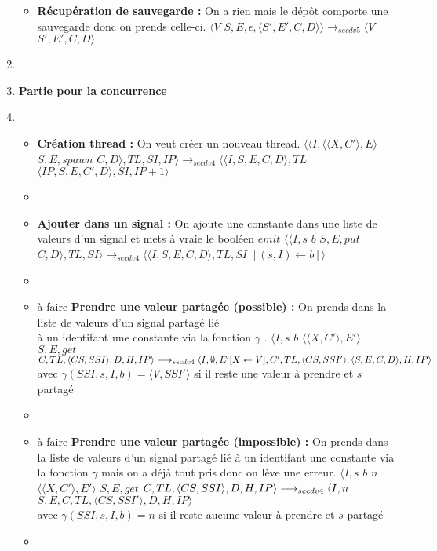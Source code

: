 \documentclass[10pt,a4paper]{article}
\begin{document}
\begin{enumerate}
\begin{itemize}
				\item[] \textbf{Récupération de sauvegarde :}  On a rien mais le dépôt comporte une sauvegarde donc on prends celle-ci.
				\smallbreak  
				$\langle V$ $S,E,\epsilon,\langle S',E',C,D\rangle\rangle
				\longrightarrow_{secdv5} \langle V$ $S',E',C,D\rangle$
			\end{itemize}
			\item[]
			
			
			
			\item[] \textbf{Partie pour la concurrence} 
			\item[]
			\begin{itemize}
				\item[]  \textbf{Création thread :} On veut créer un nouveau thread.
				\smallbreak $\langle\langle I,\langle\langle X,C'\rangle, E\rangle$ $S,E,spawn$ $C,D\rangle,TL,SI,IP\rangle 
				\longrightarrow_{secdv4} \langle\langle I,S,E,C,D\rangle,TL$ $\langle IP,S,E,C',D\rangle,SI,IP+1\rangle$
				\item[]
				
				\item[] \textbf{Ajouter dans un signal :} On ajoute une constante dans une liste de valeurs d'un signal et mets à vraie le booléen $emit$
				\smallbreak
				$\langle\langle I,s$ $b$ $S,E,put$ $C,D\rangle,TL,SI\rangle
				\longrightarrow_{secdv4} \langle\langle I,S,E,C,D\rangle,TL,SI$ $[(s,I) \leftarrow b]\rangle$ 
				\item[]
				
				\item[] à faire \textbf{Prendre une valeur partagée (possible) :} On prends dans la liste de valeurs d'un signal partagé lié \\
				à un identifant une constante via la fonction $\gamma$ .
				\smallbreak
				$\langle I,s$ $b$ $\langle\langle X,C'\rangle,E'\rangle$ $S,E,get$ $C,TL,\langle CS,SSI\rangle,D,H,IP\rangle 
				\\\longrightarrow_{secdv4} \langle I,\emptyset,E'[X \leftarrow V],C',TL,\langle CS,SSI'\rangle,\langle S,E,C,D\rangle,H,IP\rangle$\\
				avec $ \gamma(SSI,s,I,b) = \langle V,SSI'\rangle$ si il reste une valeur à prendre et $s$ partagé
				\item[]
				
				\item[] à faire \textbf{Prendre une valeur partagée (impossible) :} On prends dans la liste de valeurs d'un signal partagé lié à un identifant une constante via la fonction $\gamma$ mais on a déjà tout pris donc on lève une erreur.
				\smallbreak 
				$\langle I,s$ $b$ $n$ $\langle\langle X,C'\rangle,E'\rangle$ $S,E,get$ $C,TL,\langle CS,SSI\rangle,D,H,IP\rangle 
				\\\longrightarrow_{secdv4} \langle I,n$ $S,E,C,TL,\langle CS,SSI'\rangle,D,H,IP\rangle$\\
				avec $ \gamma(SSI,s,I,b) = n$ si il reste aucune valeur à prendre et $s$ partagé
				\item[]
				

\end{itemize}
\end{enumerate}
\end{document}
